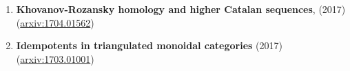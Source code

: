\documentclass[12pt]{amsart}
\renewcommand{\sl}{\mathfrak{sl}}
\begin{document}
\begin{enumerate}
\item{\bf Khovanov-Rozansky homology and higher Catalan sequences}, (2017)\\
(\href{http://arxiv.org/abs/1704.01562}{arxiv:1704.01562})

%


\item{\bf Idempotents in triangulated monoidal categories} (2017) (\href{http://arxiv.org/abs/1703.01001}{arxiv:1703.01001})

%
%  
%
%
%
%
%
%
%
\end{enumerate}
\end{document}
